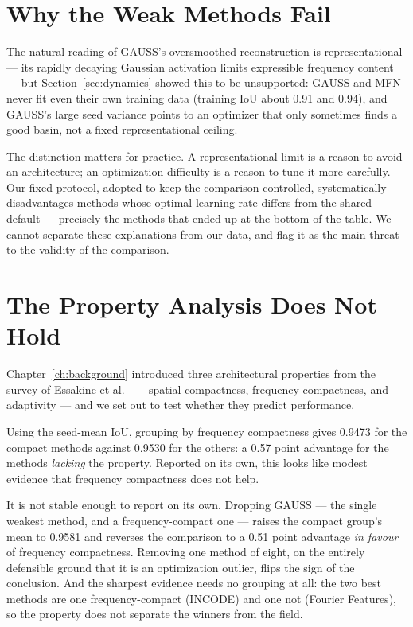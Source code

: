 \section{Why the Weak Methods Fail}

The natural reading of GAUSS's oversmoothed reconstruction is representational --- its rapidly decaying Gaussian activation limits expressible frequency content --- but Section~\ref{sec:dynamics} showed this to be unsupported: GAUSS and MFN never fit even their own training data (training IoU about 0.91 and 0.94), and GAUSS's large seed variance points to an optimizer that only sometimes finds a good basin, not a fixed representational ceiling.

The distinction matters for practice. A representational limit is a reason to avoid an architecture; an optimization difficulty is a reason to tune it more carefully. Our fixed protocol, adopted to keep the comparison controlled, systematically disadvantages methods whose optimal learning rate differs from the shared default --- precisely the methods that ended up at the bottom of the table. We cannot separate these explanations from our data, and flag it as the main threat to the validity of the comparison.

\section{The Property Analysis Does Not Hold}

Chapter~\ref{ch:background} introduced three architectural properties from the survey of Essakine et al.~\cite{essakine2024inr} --- spatial compactness, frequency compactness, and adaptivity --- and we set out to test whether they predict performance.

Using the seed-mean IoU, grouping by frequency compactness gives 0.9473 for the compact methods against 0.9530 for the others: a 0.57 point advantage for the methods \emph{lacking} the property. Reported on its own, this looks like modest evidence that frequency compactness does not help.

It is not stable enough to report on its own. Dropping GAUSS --- the single weakest method, and a frequency-compact one --- raises the compact group's mean to 0.9581 and reverses the comparison to a 0.51 point advantage \emph{in favour} of frequency compactness. Removing one method of eight, on the entirely defensible ground that it is an optimization outlier, flips the sign of the conclusion. And the sharpest evidence needs no grouping at all: the two best methods are one frequency-compact (INCODE) and one not (Fourier Features), so the property does not separate the winners from the field.

